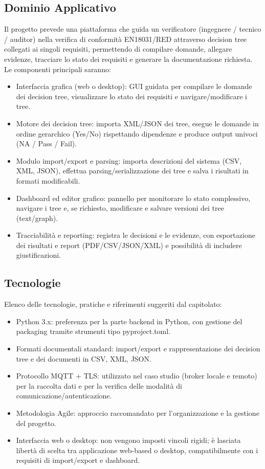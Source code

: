 \documentclass[a4paper,12pt]{article}
\begin{document}
    \subsection{Dominio Applicativo}
    Il progetto prevede una piattaforma che guida un verificatore (ingegnere / tecnico / auditor) nella verifica di conformità EN18031/RED attraverso decision tree collegati ai singoli requisiti, permettendo di compilare domande, allegare evidenze, tracciare lo stato dei requisiti e generare la documentazione richiesta.\\
    Le componenti principali saranno:
    \begin{itemize}
        \item Interfaccia grafica (web o desktop): GUI guidata per compilare le domande dei decision tree, visualizzare lo stato dei requisiti e navigare/modificare i tree.
        \item Motore dei decision tree: importa XML/JSON dei tree, esegue le domande in ordine gerarchico (Yes/No) rispettando dipendenze e produce output univoci (NA / Pass / Fail).
        \item Modulo import/export e parsing: importa descrizioni del sistema (CSV, XML, JSON), effettua parsing/serializzazione dei tree e salva i risultati in formati modificabili.
        \item Dashboard ed editor grafico: pannello per monitorare lo stato complessivo, navigare i tree e, se richiesto, modificare e salvare versioni dei tree (text/graph).
        \item Tracciabilità e reporting: registra le decisioni e le evidenze, con esportazione dei risultati e report (PDF/CSV/JSON/XML) e possibilità di includere giustificazioni.
    \end{itemize}
    \subsection{Tecnologie}
    Elenco delle tecnologie, pratiche e riferimenti suggeriti dal capitolato:
    \begin{itemize}
        \item Python 3.x: preferenza per la parte backend in Python, con gestione del packaging tramite strumenti tipo pyproject.toml. 
        \item Formati documentali standard: import/export e rappresentazione dei decision tree e dei documenti in CSV, XML, JSON. 
        \item Protocollo MQTT + TLS: utilizzato nel caso studio (broker locale e remoto) per la raccolta dati e per la verifica delle modalità di comunicazione/autenticazione. 
        \item Metodologia Agile: approccio raccomandato per l’organizzazione e la gestione del progetto. 
        \item Interfaccia web o desktop: non vengono imposti vincoli rigidi; è lasciata libertà di scelta tra applicazione web-based o desktop, compatibilmente con i requisiti di import/export e dashboard.
    \end{itemize}
\end{document}
